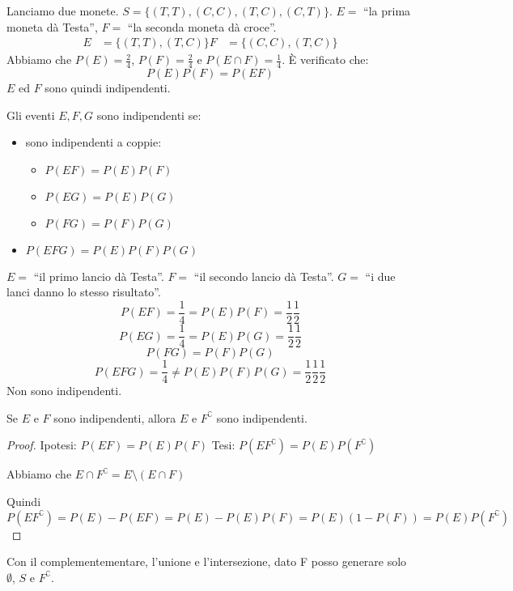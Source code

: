 \begin{exmp}
Lanciamo due monete. $S = \{ (T, T), (C, C), (T, C), (C, T) \}$. $E =$ ``la prima moneta d\`a Testa'', $F =$ ``la seconda moneta d\`a croce''.
\begin{align*}
E &= \{(T, T), (T, C)\}
F &= \{(C, C), (T, C)\}
\end{align*}
Abbiamo che $P(E) = \frac{2}{4}$, $P(F) = \frac{2}{4}$ e $P(E \cap F) = \frac{1}{4}$. \`E verificato che:
\[
P(E) P(F) = P(E F)
\]
$E$ ed $F$ sono quindi indipendenti.
\end{exmp}

\begin{defn}
Gli eventi $E, F, G$ sono indipendenti se:
\begin{itemize}
    \item sono indipendenti a coppie:
    \begin{itemize}
        \item $P(E F) = P(E) P(F)$
        \item $P(E G) = P(E) P(G)$
        \item $P(F G) = P(F) P(G)$
    \end{itemize}
    \item $P(EFG) = P(E) P(F) P(G)$
\end{itemize}
\end{defn}

\begin{exmp}
$E =$ ``il primo lancio d\`a Testa''.
$F =$ ``il secondo lancio d\`a Testa''.
$G =$ ``i due lanci danno lo stesso risultato''.
\[
P(E F) = \frac{1}{4} = P(E) P(F) = \frac{1}{2} \frac{1}{2}
\]
\[
P(E G) = \frac{1}{4} = P(E) P(G) = \frac{1}{2} \frac{1}{2}
\]
\[
P(F G) = P(F) P(G)
\]
\[
P(E F G) = \frac{1}{4} \neq P(E) P(F) P(G) = \frac{1}{2} \frac{1}{2} \frac{1}{2}
\]
Non sono indipendenti.
\end{exmp}

\begin{prop}
Se $E$ e $F$ sono indipendenti, allora $E$ e $F^{\complement}$ sono indipendenti.
\end{prop}
\begin{proof}
Ipotesi: $P(E F) = P(E) P(F)$
Tesi: $P(E F^{\complement}) = P(E) P(F^{\complement})$

Abbiamo che $E \cap F^{\complement} = E \setminus (E \cap F)$

Quindi $P(E F^{\complement}) = P(E) - P(EF) = P(E) - P(E) P(F) = P(E) (1 - P(F)) = P(E) P(F^{\complement})$
\end{proof}
Con il complementementare, l'unione e l'intersezione, dato F posso generare solo $\emptyset$, $S$ e $F^{\complement}$.

